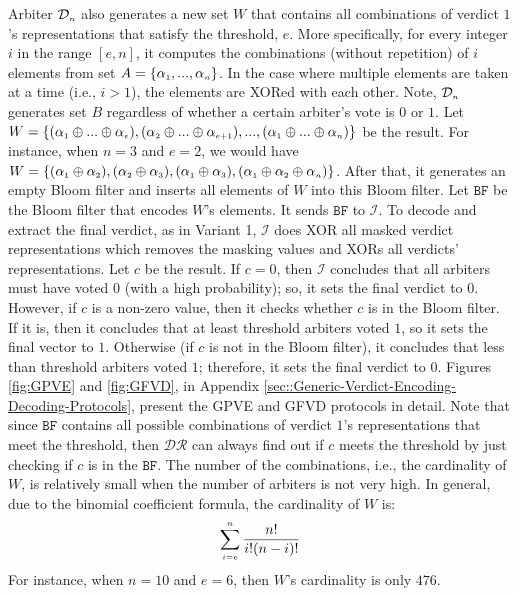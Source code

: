 Arbiter $\mathcal{D}_{\scriptscriptstyle n}$ also generates a new set $W$ that contains all  combinations of verdict $1$'s representations that satisfy the threshold, $e$. More specifically,  for every integer $i$ in the range $[e, n]$, it computes the combinations (without repetition) of $i$ elements from set $A=\{\alpha_{\scriptscriptstyle 1},..., \alpha_{\scriptscriptstyle n}\}$. In the case where  multiple elements are taken at a time (i.e., $i>1$), the elements are XORed with each other.   Note, $\mathcal{D}_{\scriptscriptstyle n}$ generates  set $B$  regardless of whether a certain arbiter's  vote is $0$ or $1$. Let $W=\{(\alpha_{\scriptscriptstyle 1}\oplus ... \oplus \alpha_{\scriptscriptstyle e}),  (\alpha_{\scriptscriptstyle 2}\oplus  ... \oplus \alpha_{\scriptscriptstyle e+1}), ..., (\alpha_{\scriptscriptstyle 1}\oplus ... \oplus \alpha_{\scriptscriptstyle n})\}$ be the result. For instance, when $n=3$ and $e=2$,  we would have $W=\{(\alpha_{\scriptscriptstyle 1}\oplus \alpha_{\scriptscriptstyle 2}),  (\alpha_{\scriptscriptstyle 2}\oplus  \alpha_{\scriptscriptstyle 3}), (\alpha_{\scriptscriptstyle 1}\oplus \alpha_{\scriptscriptstyle 3}), (\alpha_{\scriptscriptstyle 1}\oplus \alpha_{\scriptscriptstyle 2} \oplus \alpha_{\scriptscriptstyle n})\}$. After that, it generates an empty Bloom filter and  inserts all elements of $W$ into this Bloom filter. Let $\mathtt{BF}$ be the Bloom filter that encodes $W$'s elements. It sends $\mathtt{BF}$ to $\mathcal{I}$. To decode and extract the final verdict, as in Variant 1, $\mathcal{I}$ does XOR all masked verdict representations which  removes the masking values and XORs all verdicts’ representations. Let $c$ be the result.  If $c=0$, then $\mathcal{I}$ concludes that all arbiters must have voted $0$ (with a high probability); so, it sets the final verdict to $0$. However, if $c$ is a non-zero value, then it checks whether $c$ is in the Bloom filter. If it is, then it concludes that at least threshold arbiters voted $1$, so it sets the final vector to $1$. Otherwise (if $c$ is not in the Bloom filter), it concludes that less than threshold arbiters voted $1$; therefore, it sets the final verdict to $0$.  Figures \ref{fig:GPVE} and \ref{fig:GFVD}, in Appendix \ref{sec::Generic-Verdict-Encoding-Decoding-Protocols}, present the  GPVE and GFVD protocols in detail. Note that since $\mathtt{BF}$ contains all possible combinations of verdict $1$'s representations that meet the threshold, then $\mathcal{DR}$ can always find out if $c$ meets the threshold by just checking if $c$ is in the $\mathtt{BF}$. The number of the combinations, i.e., the cardinality of $W$, is relatively small when the number of arbiters is not very high. In general, due to the binomial coefficient formula, the cardinality of $W$ is:
%
 $$\sum\limits_{\scriptscriptstyle i=e}^{\scriptscriptstyle n}\frac{n!}{i!(n- i)!}$$
 For instance, when $n=10$ and $e=6$, then $W$'s cardinality is only $476$. 




